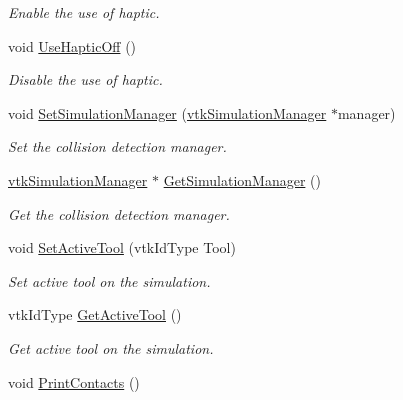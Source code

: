 \begin{DoxyCompactItemize}
\begin{DoxyCompactList}\small\item\em Enable the use of haptic. \item\end{DoxyCompactList}\item 
\hypertarget{classvtkSimulation_acfcdbf46baa7db1258e690dd8f4ecf0a}{
void \hyperlink{classvtkSimulation_acfcdbf46baa7db1258e690dd8f4ecf0a}{UseHapticOff} ()}
\label{classvtkSimulation_acfcdbf46baa7db1258e690dd8f4ecf0a}

\begin{DoxyCompactList}\small\item\em Disable the use of haptic. \item\end{DoxyCompactList}\item 
void \hyperlink{classvtkSimulation_ae07347b307c27d7a322a29b5f14f2715}{SetSimulationManager} (\hyperlink{classvtkSimulationManager}{vtkSimulationManager} $\ast$manager)
\begin{DoxyCompactList}\small\item\em Set the collision detection manager. \item\end{DoxyCompactList}\item 
\hyperlink{classvtkSimulationManager}{vtkSimulationManager} $\ast$ \hyperlink{classvtkSimulation_a24f8f2f19d4d068aa53d24bc3a2ec9d1}{GetSimulationManager} ()
\begin{DoxyCompactList}\small\item\em Get the collision detection manager. \item\end{DoxyCompactList}\item 
void \hyperlink{classvtkSimulation_a1f7164f2c7bfe4c3b2498d913d5ecf63}{SetActiveTool} (vtkIdType Tool)
\begin{DoxyCompactList}\small\item\em Set active tool on the simulation. \item\end{DoxyCompactList}\item 
vtkIdType \hyperlink{classvtkSimulation_a832386edded984585c69bcdaf4800f60}{GetActiveTool} ()
\begin{DoxyCompactList}\small\item\em Get active tool on the simulation. \item\end{DoxyCompactList}\item 
\hypertarget{classvtkSimulation_ae4b7e2fe91b05ed7319b01a1ab067f74}{
void \hyperlink{classvtkSimulation_ae4b7e2fe91b05ed7319b01a1ab067f74}{PrintContacts} ()}
\label{classvtkSimulation_ae4b7e2fe91b05ed7319b01a1ab067f74}


\end{DoxyCompactItemize}
